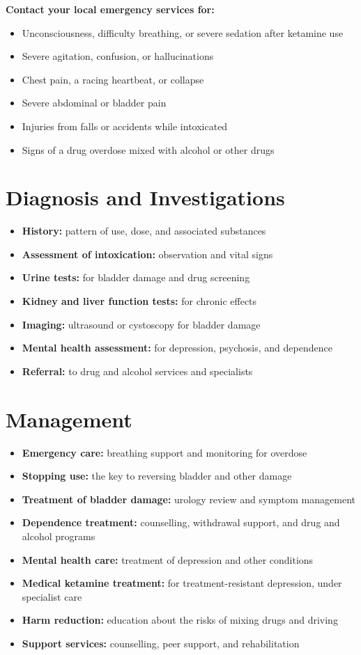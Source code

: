 \textbf{Contact your local emergency services for:}
\begin{itemize}
    \item Unconsciousness, difficulty breathing, or severe sedation after ketamine use
    \item Severe agitation, confusion, or hallucinations
    \item Chest pain, a racing heartbeat, or collapse
    \item Severe abdominal or bladder pain
    \item Injuries from falls or accidents while intoxicated
    \item Signs of a drug overdose mixed with alcohol or other drugs
\end{itemize}

\section*{Diagnosis and Investigations}
\begin{itemize}
    \item \textbf{History:} pattern of use, dose, and associated substances
    \item \textbf{Assessment of intoxication:} observation and vital signs
    \item \textbf{Urine tests:} for bladder damage and drug screening
    \item \textbf{Kidney and liver function tests:} for chronic effects
    \item \textbf{Imaging:} ultrasound or cystoscopy for bladder damage
    \item \textbf{Mental health assessment:} for depression, psychosis, and dependence
    \item \textbf{Referral:} to drug and alcohol services and specialists
\end{itemize}

\section*{Management}
\begin{itemize}
    \item \textbf{Emergency care:} breathing support and monitoring for overdose
    \item \textbf{Stopping use:} the key to reversing bladder and other damage
    \item \textbf{Treatment of bladder damage:} urology review and symptom management
    \item \textbf{Dependence treatment:} counselling, withdrawal support, and drug and alcohol programs
    \item \textbf{Mental health care:} treatment of depression and other conditions
    \item \textbf{Medical ketamine treatment:} for treatment-resistant depression, under specialist care
    \item \textbf{Harm reduction:} education about the risks of mixing drugs and driving
    \item \textbf{Support services:} counselling, peer support, and rehabilitation
\end{itemize}

